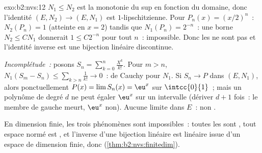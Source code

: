 \begin{solution}{exo:b2:nvs:12}
$N_1 \leq N_2$ est la monotonie du sup en fonction du domaine, donc
l'identité $(E, N_2) \to (E, N_1)$ est $1$-lipschitzienne. Pour $P_n(x) =
(x/2)^n$~: $N_2(P_n) = 1$ (atteinte en $x = 2$) tandis que $N_1(P_n) =
2^{-n}$~: une borne $N_2 \leq CN_1$ donnerait $1 \leq C2^{-n}$ pour
tout $n$~: impossible. Donc les  ne sont pas  et
l'identité inverse est une bijection linéaire discontinue.

\emph{Incomplétude~:} posons $S_n = \sum_{k=0}^{n}\frac{X^k}{k!}$.
Pour $m > n$, $N_1(S_m - S_n) \leq \sum_{k>n}\frac1{k!} \to 0$~:
de Cauchy pour $N_1$. Si $S_n \to P$ dans $(E, N_1)$, alors
ponctuellement $P(x) = \lim S_n(x) = \eu^x$ sur $\intcc{0}{1}$~; mais un
polynôme de degré $d$ ne peut égaler $\eu^x$ sur un intervalle (dériver
$d + 1$ fois~: le membre de gauche meurt, $\eu^x$ non). Aucune limite
dans $E$~: non .

En dimension finie, les trois phénomènes sont impossibles~: toutes les
 sont , tout espace normé est , et l'inverse
d'une bijection linéaire est linéaire issue d'un espace de dimension
finie, donc  (\cref{thm:b2:nvs:finitedim}).
\end{solution}

